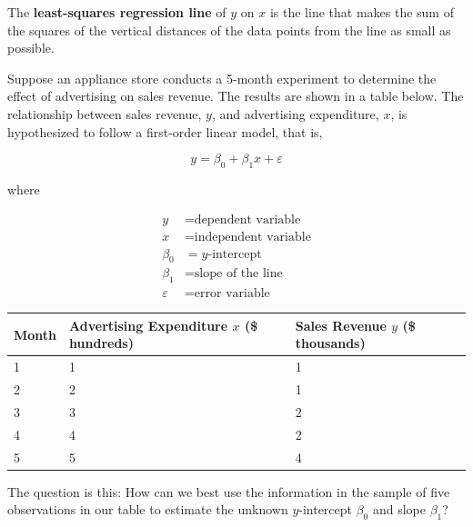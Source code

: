\begin{definition}
The \textbf{least-squares regression line} of $y$ on $x$ is the line that makes the sum of the squares of the vertical distances of the data points from the line as small as possible.
\end{definition}

\begin{example}
Suppose an appliance store conducts a 5-month experiment to determine the effect of advertising on sales revenue. The results are shown in a table below. The relationship between sales revenue, $y$, and advertising expenditure, $x$, is hypothesized to follow a first-order linear model, that is,

\[
y = \beta_0 + \beta_1 x + \varepsilon
\]

where

\begin{align*}
y & = \text{dependent variable} \\
x & = \text{independent variable} \\
\beta_0 & = \text{$y$-intercept} \\
\beta_1 & = \text{slope of the line} \\
\varepsilon & = \text{error variable}
\end{align*}


\begin{table}[H]
\centering
\small
\renewcommand{\arraystretch}{1.2}
\setlength{\tabcolsep}{4pt} %
\begin{tabular}{p{1.5cm} p{3cm} p{3cm}}
\toprule
\textbf{Month} &
\shortstack{\textbf{Advertising} \\ \textbf{Expenditure} \\ $x$ (\$ hundreds)} &
\shortstack{\textbf{Sales} \\ \textbf{Revenue} \\ $y$ (\$ thousands)} \\
\midrule
1 & 1 & 1 \\
2 & 2 & 1 \\
3 & 3 & 2 \\
4 & 4 & 2 \\
5 & 5 & 4 \\
\bottomrule
\end{tabular}
\end{table}



The question is this: How can we best use the information in the sample of five observations in our table to estimate the unknown $y$-intercept $\beta_0$ and slope $\beta_1$?


\end{example}
